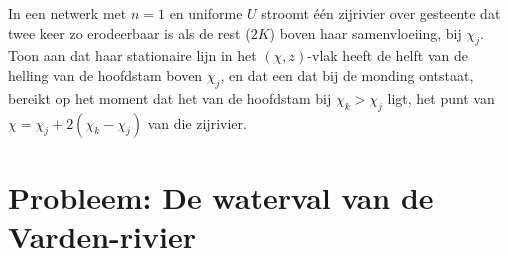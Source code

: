\begin{exercise}[$\star\star\star$]\label{exo:b3:quantitative-geomorphology:12}
In een netwerk met $n = 1$ en uniforme $U$ stroomt één zijrivier over gesteente dat
twee keer zo erodeerbaar is als de rest ($2K$) boven haar samenvloeiing, bij $\chi_j$. Toon aan dat
haar stationaire lijn in het $(\chi, z)$-vlak heeft de helft van de helling van de
hoofdstam boven $\chi_j$, en dat een  dat bij de monding ontstaat, bereikt
op het moment dat het  van de hoofdstam bij $\chi_k > \chi_j$ ligt, het punt
van $\chi = \chi_j + 2(\chi_k - \chi_j)$ van die zijrivier.
\end{exercise}

\section{Probleem: De waterval van de Varden-rivier}

